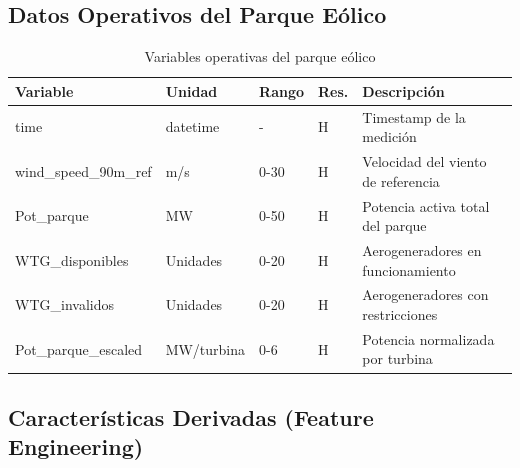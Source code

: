 \documentclass[conference]{IEEEtran}
\begin{document}
	\vspace{0.5cm}
	
	\subsection{Datos Operativos del Parque Eólico}
	
	\begin{table}[htbp]
		\centering
		\caption{Variables operativas del parque eólico}
		\begin{tabular}{|p{2.5cm}|p{1.2cm}|p{1.4cm}|p{1cm}|p{3.5cm}|}
			\hline
			\textbf{Variable} & \textbf{Unidad} & \textbf{Rango} & \textbf{Res.} & \textbf{Descripción} \\
			\hline
			time & datetime & - & H & Timestamp de la medición \\
			\hline
			wind\_speed\_90m\_ref & m/s & 0-30 & H & Velocidad del viento de referencia \\
			\hline
			Pot\_parque & MW & 0-50 & H & Potencia activa total del parque \\
			\hline
			WTG\_disponibles & Unidades & 0-20 & H & Aerogeneradores en funcionamiento \\
			\hline
			WTG\_invalidos & Unidades & 0-20 & H & Aerogeneradores con restricciones \\
			\hline
			Pot\_parque\_escaled & MW/turbina & 0-6 & H & Potencia normalizada por turbina \\
			\hline
		\end{tabular}
		\label{tab:operational_variables}
	\end{table}
	
	\vspace{0.5cm}
	
	\subsection{Características Derivadas (Feature Engineering)}
	
\end{document}
